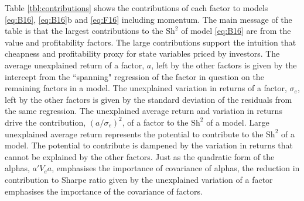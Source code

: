 

Table \ref{tbl:contributions} shows the contributions of each factor to models
\ref{eq:B16}, \ref{eq:B16}b and \ref{eq:F16} including momentum.
The main message of the table is that the largest contributions to the
$\text{Sh}^2$ of model \ref{eq:B16} are from the value and profitability
factors. The large contributions support the intuition that
cheapness and profitability proxy for state variables priced by investors.
The average unexplained return of a factor, $a$, left by the other factors is
given by the 
intercept from the ``spanning" regression of the factor in
question on the remaining
factors in a model.
The unexplained variation in returns of a factor, $\sigma_e$, left by the other
factors is given by the standard deviation of the residuals from the same
regression.
The unexplained average return and variation in returns drive the contribution,
$(a/\sigma_e)^2$, of a factor to the $\text{Sh}^2$ of a model.
Large unexplained average return represents the potential to contribute
to the $\text{Sh}^2$ of a model.
The potential to contribute is dampened by the variation in returns that cannot
be explained by the other factors.
Just as the quadratic form of the alphas, $a'V_ea$, emphasises the importance
of covariance of alphas,
the reduction in contribution to Sharpe ratio given by the unexplained
variation of a factor emphasises the importance of the covariance of factors.


